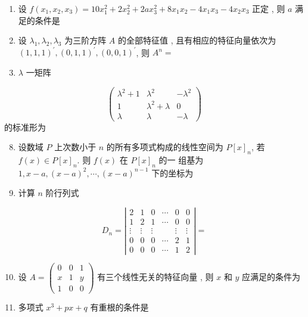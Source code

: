 \documentclass[10pt]{article}
\begin{document}
{\begin{enumerate}
  \item  设  $f\left(x_{1}, x_{2}, x_{3}\right)=10 x_{1}^{2}+2 x_{2}^{2}+2 a x_{3}^{2}+8 x_{1} x_{2}-4 x_{1} x_{3}-4 x_{2} x_{3}$  正定 ,  则  $a$  满足的条件是 

  \item  设  $\lambda_{1}, \lambda_{2}, \lambda_{3}$  为三阶方阵  $A$  的全部特征值 ,  且有相应的特征向量依次为  $(1,1,1)^{\prime},(0,1,1)^{\prime},(0,0,1)^{\prime}$,  则  $A^{n}=$

  \item $\lambda$  一矩阵 

\end{enumerate}
$$
\left(\begin{array}{ccc}
\lambda^{2}+1 & \lambda^{2} & -\lambda^{2} \\
1 & \lambda^{2}+\lambda & 0 \\
\lambda & \lambda & -\lambda
\end{array}\right)
$$
 的标准形为 

\begin{enumerate}
  \setcounter{enumi}{7}
  \item  设数域  $P$  上次数小于  $n$  的所有多项式构成的线性空间为  $P[x]_{n}$,  若  $f(x) \in P[x]_{n}$.  则  $f(x)$  在  $P[x]_{n}$  的一   组基为  $1, x-a,(x-a)^{2}, \cdots,(x-a)^{n-1}$  下的坐标为 

  \item  计算  $n$  阶行列式 

\end{enumerate}
$$
D_{n}=\left|\begin{array}{cccccc}
2 & 1 & 0 & \cdots & 0 & 0 \\
1 & 2 & 1 & \cdots & 0 & 0 \\
\vdots & \vdots & \vdots & & \vdots & \vdots \\
0 & 0 & 0 & \cdots & 2 & 1 \\
0 & 0 & 0 & \cdots & 1 & 2
\end{array}\right|=
$$

\begin{enumerate}
  \setcounter{enumi}{9}
  \item  设  $A=\left(\begin{array}{lll}0 & 0 & 1 \\ x & 1 & y \\ 1 & 0 & 0\end{array}\right)$  有三个线性无关的特征向量 ,  则  $x$  和  $y$  应满足的条件为 

  \item  多项式  $x^{3}+p x+q$  有重根的条件是 


\end{enumerate}}
\end{document}

